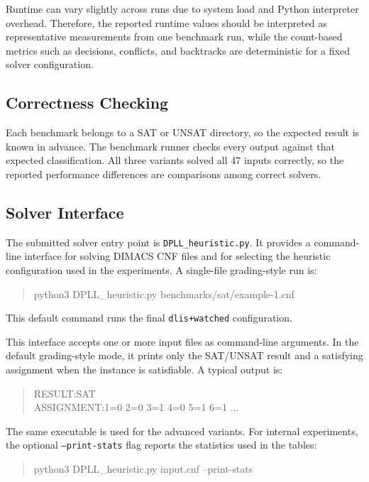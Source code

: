 \documentclass[11pt]{article}
\begin{document}
Runtime can vary slightly across runs due to system load and Python interpreter
overhead. Therefore, the reported runtime values should be interpreted as
representative measurements from one benchmark run, while the count-based
metrics such as decisions, conflicts, and backtracks are deterministic for a
fixed solver configuration.

\subsection{Correctness Checking}

Each benchmark belongs to a SAT or UNSAT directory, so the expected result is
known in advance. The benchmark runner checks every output against that expected
classification. All three variants solved all 47 inputs correctly, so the
reported performance differences are comparisons among correct solvers.

\subsection{Solver Interface}

The submitted solver entry point is \texttt{DPLL\_heuristic.py}. It provides a
command-line interface for solving DIMACS CNF files and for selecting the
heuristic configuration used in the experiments. A single-file grading-style
run is:

\begin{quote}
\small
\ttfamily
python3 DPLL\_heuristic.py benchmarks/sat/example-1.cnf
\end{quote}

This default command runs the final \texttt{dlis+watched} configuration.

This interface accepts one or more input files as command-line arguments. In
the default grading-style mode, it prints only the SAT/UNSAT result and a
satisfying assignment when the instance is satisfiable. A typical output is:

\begin{quote}
\small
\ttfamily
\raggedright
RESULT:SAT\\
ASSIGNMENT:1=0 2=0 3=1 4=0 5=1 6=1 ...
\end{quote}

The same executable is used for the advanced variants. For internal
experiments, the optional \texttt{--print-stats} flag reports the statistics
used in the tables:

\begin{quote}
\small
\ttfamily
python3 DPLL\_heuristic.py input.cnf --print-stats
\end{quote}
\end{document}

